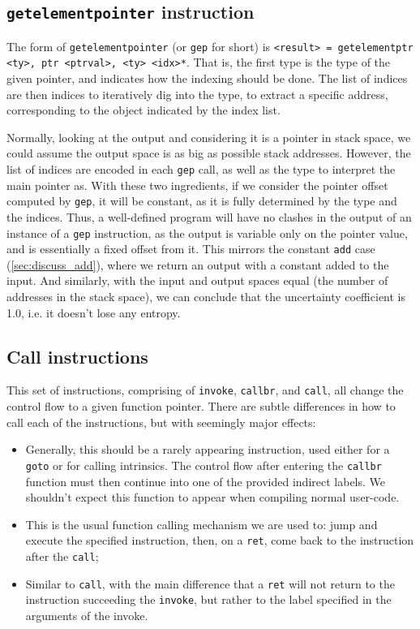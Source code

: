 \documentclass[a4paper]{article}
\newcommand{\inst}[1]{\texttt{#1}}
\begin{document}
\subsection{\inst{getelementpointer} instruction}
The form of \inst{getelementpointer} (or \inst{gep} for short) is
\texttt{<result> = getelementptr <ty>, ptr <ptrval>{, <ty> <idx>}*}. That is,
the first type is the type of the given pointer, and indicates how the indexing
should be done. The list of indices are then indices to iteratively dig into
the type, to extract a specific address, corresponding to the object indicated
by the index list.

Normally, looking at the output and considering it is a pointer in stack space,
we could assume the output space is as big as possible stack addresses.
However, the list of indices are encoded in each \inst{gep} call, as well as
the type to interpret the main pointer as. With these two ingredients, if we
consider the pointer offset computed by \inst{gep}, it will be constant, as it
is fully determined by the type and the indices. Thus, a well-defined program
will have no clashes in the output of an instance of a \inst{gep} instruction,
as the output is variable only on the pointer value, and is essentially a fixed
offset from it. This mirrors the constant \inst{add} case
(\autoref{sec:discuss_add}), where we return an output with a constant added to
the input. And similarly, with the input and output spaces equal (the number of
addresses in the stack space), we can conclude that the uncertainty coefficient
is 1.0, i.e. it doesn't lose any entropy.

\subsection{Call instructions}\label{sec:insts_call}
This set of instructions, comprising of \inst{invoke}, \inst{callbr}, and
\inst{call}, all change the control flow to a given function pointer. There are
subtle differences in how to call each of the instructions, but with seemingly
major effects:
\begin{itemize}
    \item [\inst{callbr}] Generally, this should be a rarely appearing
        instruction, used either for a \texttt{goto} or for calling intrinsics.
        The control flow after entering the \inst{callbr} function must then
        continue into one of the provided indirect labels. We shouldn't expect
        this function to appear when compiling normal user-code.
    \item [\inst{call}] This is the usual function calling mechanism we are
        used to: jump and execute the specified instruction, then, on a
        \inst{ret}, come back to the instruction after the \inst{call};
    \item [\inst{invoke}] Similar to \inst{call}, with the main difference that
        a \inst{ret} will not return to the instruction succeeding the
        \inst{invoke}, but rather to the label specified in the arguments of
        the invoke.
\end{itemize}
\end{document}
